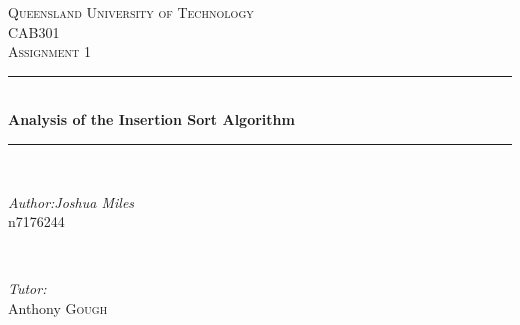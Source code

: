 \documentclass[12pt]{article}
\begin{document}
\begin{titlepage}

\newcommand{\HRule}{\rule{\linewidth}{0.5mm}} %

\center %
 

\textsc{\LARGE Queensland University of Technology}\\[1.5cm] %
\textsc{\Large CAB301}\\[0.5cm] %
\textsc{\large Assignment 1}\\[0.5cm] %


\HRule \\[0.4cm]
{ \huge \bfseries Analysis of the Insertion Sort Algorithm}\\[0.4cm] %
\HRule \\[1.5cm]
 

\begin{minipage}{0.4\textwidth}
\begin{flushleft} \large
\emph{Author:Joshua Miles}\\
n7176244 %
\end{flushleft}
\end{minipage}
~
\begin{minipage}{0.4\textwidth}
\begin{flushright} \large
\emph{Tutor:} \\
Anthony \textsc{Gough} %
\end{flushright}
\end{minipage}\\[0.5cm]



\end{titlepage}
\end{document}
